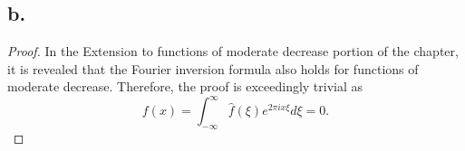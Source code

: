 \documentclass{article}
\newcommand{\mycomment}[1]{}
\begin{document}
\subsection*{b.}
\begin{proof}
    \mycomment{
    Note that by the continuity of $f$ and since $g \in \mathcal{S}(\mathbb{R})$ we have that $f, g, \hat{f}, \hat{g}$ are all integrable. Therefore we can use Fubini's theorem to state
    \[
    \int f(x)\hat{g}(x)dx = \int g(y)\hat{f}(y)dy.    
    \]
    With $g \in \mathcal{S}(\mathbb{R})$, by the Fourier inversion formula 
    \[
    g(x) = \int_{-\infty}^{\infty}\hat{g}(y)e^{2 \pi i x y}dy.    
    \]
    Taking $K_{\delta}(t - y) = \hat{g}(y) \in \mathcal{S}(\mathbb{R})$:
    \begin{align*}
        \int_{-\infty}^{\infty}f(x) \hat{g}(x) dx &= \int_{-\infty}^{\infty} \hat{f}(y)g(y) dy \\
        &= \int_{-\infty}^{\infty}\hat{f}(y) \int_{-\infty}^{\infty}\hat{g}(\xi)e^{2 \pi i y \xi}d \xi dy \\
        &= \int_{-\infty}^{\infty}\hat{f}(y) \int_{-\infty}^{\infty}K_{\delta}(t - \xi) e^{2 \pi i y \xi}d \xi dy \\
        &= -\int_{-\infty}^{\infty}f(y)\int_{-\infty}^{\infty}K_{\delta}(u)e^{2 \pi i y(t - u)}du dy \\
        &= -\int_{-\infty}^{\infty} \hat{f}(y)e^{2 \pi i yt}\hat{K}_{\delta}(y) dy = 0.
    \end{align*}
    Note that by theorem 1.3 (pg. 137) we have that since $K_{\delta} \in \mathcal{S}(\mathbb{R})$ we have $\hat{K}_{\delta} \in \mathcal{S}(\mathbb{R})$. We thus have 
    \[
    -\lim\limits_{\delta \to 0} \int_{-\infty}^{\infty}\hat{f}(y)e^{2 \pi i yt } \hat{K}_{\delta}(y)dy = \lim\limits_{\delta \to 0}\int_{-\infty}^{\infty} f(x)\hat{g}(x)dx = (f*K_{\delta}(t)) = f(t) = 0.  
    \] 
    }
    In the Extension to functions of moderate decrease portion of the chapter, it is revealed that the Fourier inversion formula also holds for functions of moderate decrease. Therefore, the proof is exceedingly trivial as
    \[
    f(x) = \int_{-\infty}^{\infty}\hat{f}(\xi)e^{2 \pi ix\xi} d \xi = 0.    
    \]
\end{proof}
\end{document}
